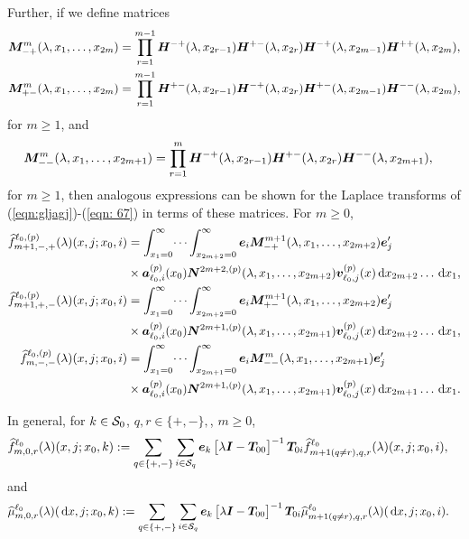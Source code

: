 Further, if we define matrices
\begin{align*}
	\boldsymbol M^{m}_{-+}(\lambda,x_1,\dots,x_{2m}) &= \prod_{r=1}^{m-1}\boldsymbol H^{-+}(\lambda,x_{2r-1})\boldsymbol H^{+-}(\lambda,x_{2r}) \boldsymbol H^{-+}(\lambda,x_{2m-1}) \boldsymbol H^{++}(\lambda,x_{2m}),
	\\\boldsymbol M^{m}_{+-}(\lambda,x_1,\dots,x_{2m}) &= \prod_{r=1}^{m-1}\boldsymbol H^{+-}(\lambda,x_{2r-1})\boldsymbol H^{-+}(\lambda,x_{2r}) \boldsymbol H^{+-}(\lambda,x_{2m-1}) \boldsymbol H^{--}(\lambda,x_{2m}),
\end{align*}
for \(m\geq 1\), and
\begin{align*}
	&\boldsymbol M^{m}_{--}(\lambda,x_1,\dots,x_{2m+1}) \nonumber 
	= \prod_{r=1}^{m}\boldsymbol H^{-+}(\lambda,x_{2r-1})\boldsymbol H^{+-}(\lambda,x_{2r}) 
	\boldsymbol H^{--}(\lambda,x_{2m+1}),\nonumber 
\end{align*}
for \(m\geq 1\), then analogous expressions can be shown for the Laplace transforms of (\ref{eqn:gljagj})-(\ref{eqn: 67}) in terms of these matrices. For \(m\geq 0\), 
\begin{align*}
	\widehat f^{\ell_0,(p)}_{m+1,-,+}(\lambda)(x, j; x_0,i) &= 
		\int_{x_1=0}^\infty \dots \int_{x_{2m+2}=0}^\infty \boldsymbol e_i\boldsymbol M^{m+1}_{-+}(\lambda,x_1,\dots,x_{2m+2})\boldsymbol e_j'{} \nonumber 
		\\&\times \boldsymbol a_{\ell_0,i}^{(p)}(x_0) \boldsymbol N^{2m+2,(p)}(\lambda,x_1,\dots,x_{2m+2}) {\boldsymbol v}_{\ell_0,j}^{(p)}( x)\, \mathrm{d} x_{2m+2}\dots\, \mathrm{d} x_1,
	\\ \widehat f^{\ell_0,(p)}_{m+1,+,-}(\lambda)(x, j; x_0,i) &= 
		\int_{x_1=0}^\infty \dots \int_{x_{2m+2}=0}^\infty \boldsymbol e_i\boldsymbol M^{m+1}_{+-}(\lambda,x_1,\dots,x_{2m+2})\boldsymbol e_j'{} \nonumber 
		\\&\times \boldsymbol a_{\ell_0,i}^{(p)}(x_0) \boldsymbol N^{2m+1,(p)}(\lambda,x_1,\dots,x_{2m+1}) {\boldsymbol v}_{\ell_0,j}^{(p)}( x)\, \mathrm{d} x_{2m+2}\dots\, \mathrm{d} x_1,
	\\ \widehat f^{\ell_0,(p)}_{m,-,-}(\lambda)(x, j; x_0,i) &= 
		\int_{x_1=0}^\infty \dots \int_{x_{2m+1}=0}^\infty \boldsymbol e_i\boldsymbol M^m_{--}(\lambda,x_1,\dots,x_{2m+1})\boldsymbol e_j'{} \nonumber 
		\\&\times \boldsymbol a_{\ell_0,i}^{(p)}(x_0) \boldsymbol N^{2m+1,(p)}(\lambda,x_1,\dots,x_{2m+1}) {\boldsymbol v}_{\ell_0,j}^{(p)}( x)\, \mathrm{d} x_{2m+1}\dots\, \mathrm{d} x_1.
\end{align*}

In general, for \(k\in\mathcal{S}_0\), \(q,r\in \{+,-\},\), \(m\geq 0\),
\begin{align}
	\widehat f_{m,0,r}^{\ell_0}(\lambda)(x,j;x_0,k)  
	&:= \sum_{q\in\{+,-\}}\sum_{i\in\mathcal{S}_q}\boldsymbol e_k\begin{bmatrix} \lambda \boldsymbol I - \boldsymbol T_{00} \end{bmatrix}^{-1}\boldsymbol T_{0i}\widehat f_{m+1(q\neq r),q,r}^{\ell_0}(\lambda)(x,j;x_0,i), \label{eqn: vma}
\end{align}
and
\begin{align}
	\widehat \mu_{m,0,r}^{\ell_0}(\lambda)(\, \mathrm{d} x,j;x_0,k) \label{eqn:kdneee}
	&:= \sum_{q\in\{+,-\}}\sum_{i\in\mathcal{S}_q}\boldsymbol e_k\begin{bmatrix} \lambda \boldsymbol I - \boldsymbol T_{00} \end{bmatrix}^{-1}\boldsymbol T_{0i}\widehat \mu_{m+1(q\neq r),q,r}^{\ell_0}(\lambda)(\, \mathrm{d} x,j;x_0,i).
\end{align}

